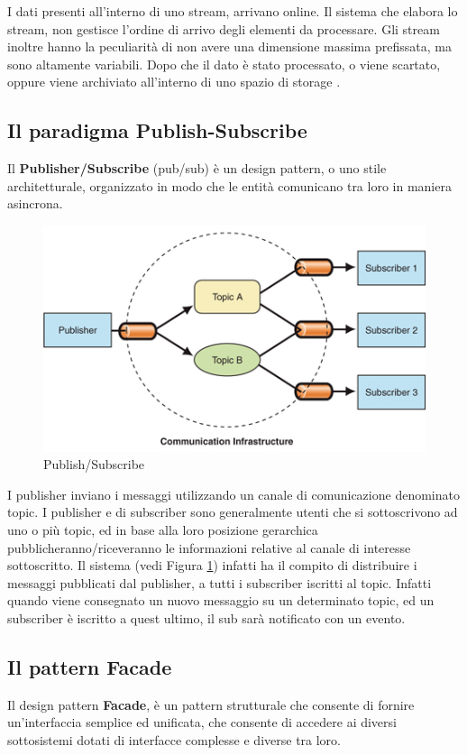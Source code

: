 \documentclass[11pt]{article}
\begin{document}
I dati presenti all'interno di uno stream, arrivano online. Il sistema che elabora lo stream, non gestisce l'ordine di arrivo degli elementi da processare. Gli stream inoltre hanno la peculiarità di non avere una dimensione massima prefissata, ma sono altamente variabili. Dopo che il dato è stato processato, o viene scartato, oppure viene archiviato all'interno di uno spazio di storage \cite{Babcock:2002:MID:543613.543615}.

\subsection{Il paradigma Publish-Subscribe}
Il \textbf{Publisher/Subscribe} (pub/sub) è un design pattern, o uno stile architetturale, organizzato in modo che le entità comunicano tra loro in maniera asincrona.

\begin{figure}[H]
	\centering
	\includegraphics[scale=0.50]{images/pubsub.jpg}
	\caption{Publish/Subscribe}
	\label{pubsub}
\end{figure}

I publisher inviano i messaggi utilizzando un canale di comunicazione denominato topic. I publisher e di subscriber sono generalmente utenti che si sottoscrivono ad uno o più topic, ed in base alla loro posizione gerarchica pubblicheranno/riceveranno le informazioni relative al canale di interesse sottoscritto. Il sistema (vedi Figura \ref{pubsub}) infatti ha il compito di distribuire i messaggi pubblicati dal publisher, a tutti i subscriber iscritti al topic. Infatti quando viene consegnato un nuovo messaggio su un determinato topic, ed un subscriber è iscritto a quest ultimo, il sub sarà notificato con un evento.

\subsection{Il pattern Facade}
Il design pattern \textbf{Facade}, è un pattern strutturale che consente di fornire un'interfaccia semplice ed unificata, che consente di accedere ai diversi sottosistemi dotati di interfacce complesse e diverse tra loro.
\end{document}
